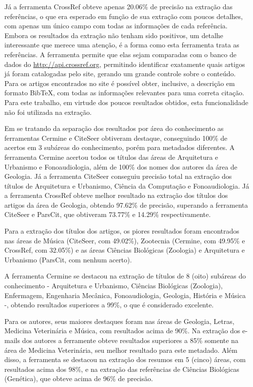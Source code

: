 Já a ferramenta CrossRef obteve apenas 20.06\% de precisão na extração das referências, o que era esperado em função de sua extração com poucos detalhes, com apenas um único campo com todas as informações de cada referência. Embora os resultados da extração não tenham sido positivos, um detalhe interessante que merece uma atenção, é a forma como esta ferramenta trata as referências. A ferramenta permite que elas sejam comparadas com o banco de dados do \url{http://api.crossref.org}, permitindo identificar exatamente quais artigos já foram catalogadas pelo site, gerando um grande controle sobre o conteúdo. Para os artigos encontrados no site é possível obter, inclusive, a descrição em formato BibTeX, com todas as informações relevantes para uma correta citação. Para este trabalho, em virtude dos poucos resultados obtidos, esta funcionalidade não foi utilizada na extração.


Em se tratando da separação dos resultados por área do conhecimento as ferramentas Cermine e CiteSeer obtiveram destaque, conseguindo 100\% de acertos em 3 subáreas do conhecimento, porém para metadados diferentes. A ferramenta Cermine acertou todos os títulos das áreas de Arquitetura e Urbanismo e Fonoaudiologia, além de 100\% dos nomes dos autores da área de Geologia. Já a ferramenta CiteSeer conseguiu precisão total na extração dos títulos de Arquitetura e Urbanismo, Ciência da Computação e Fonoaudiologia. Já a ferramenta CrossRef obteve melhor resultado na extração dos títulos dos artigos da área de Geologia, obtendo 97.62\% de precisão, superando a ferramenta CiteSeer e ParsCit, que obtiveram 73.77\% e 14.29\% respectivamente.

Para a extração dos títulos dos artigos, os piores resultados foram encontrados nas áreas de Música (CiteSeer, com 49.02\%), Zootecnia (Cermine, com 49.95\% e CrossRef, com 32.05\%) e as áreas Ciências Biológicas (Zoologia) e Arquitetura e Urbanismo (ParsCit, com nenhum acerto).

A ferramenta Cermine se destacou na extração de títulos de 8 (oito) subáreas do conhecimento - Arquitetura e Urbanismo, Ciências Biológicas (Zoologia), Enfermagem, Engenharia Mecânica, Fonoaudiologia, Geologia, História e Música -, obtendo resultados superiores a 99\%, o que é considerado excelente. 

Para os autores, seus maiores destaques foram nas áreas de Geologia, Letras, Medicina Veterinária e Música, com resultados acima de 90\%. Na extração dos e-mails dos autores a ferramente obteve resultados superiores a 85\% somente na área de Medicina Veterinária, seu melhor resultado para este metadado. Além disso, a ferramenta se destacou na extração dos resumos em 5 (cinco) áreas, com resultados acima dos 98\%, e na extração das referências de Ciências Biológicas (Genética), que obteve acima de 96\% de precisão.

